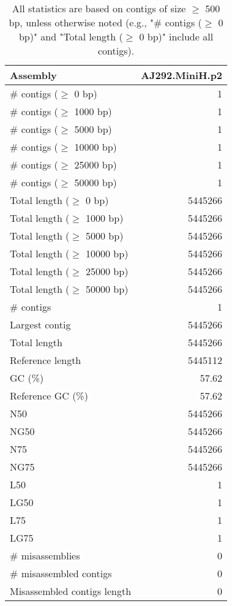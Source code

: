 \documentclass[12pt,a4paper]{article}
\begin{document}
\begin{table}[ht]
\begin{center}
\caption{All statistics are based on contigs of size $\geq$ 500 bp, unless otherwise noted (e.g., "\# contigs ($\geq$ 0 bp)" and "Total length ($\geq$ 0 bp)" include all contigs).}
\begin{tabular}{|l*{1}{|r}|}
\hline
Assembly & AJ292.MiniH.p2 \\ \hline
\# contigs ($\geq$ 0 bp) & 1 \\ \hline
\# contigs ($\geq$ 1000 bp) & 1 \\ \hline
\# contigs ($\geq$ 5000 bp) & 1 \\ \hline
\# contigs ($\geq$ 10000 bp) & 1 \\ \hline
\# contigs ($\geq$ 25000 bp) & 1 \\ \hline
\# contigs ($\geq$ 50000 bp) & 1 \\ \hline
Total length ($\geq$ 0 bp) & 5445266 \\ \hline
Total length ($\geq$ 1000 bp) & 5445266 \\ \hline
Total length ($\geq$ 5000 bp) & 5445266 \\ \hline
Total length ($\geq$ 10000 bp) & 5445266 \\ \hline
Total length ($\geq$ 25000 bp) & 5445266 \\ \hline
Total length ($\geq$ 50000 bp) & 5445266 \\ \hline
\# contigs & 1 \\ \hline
Largest contig & 5445266 \\ \hline
Total length & 5445266 \\ \hline
Reference length & 5445112 \\ \hline
GC (\%) & 57.62 \\ \hline
Reference GC (\%) & 57.62 \\ \hline
N50 & 5445266 \\ \hline
NG50 & 5445266 \\ \hline
N75 & 5445266 \\ \hline
NG75 & 5445266 \\ \hline
L50 & 1 \\ \hline
LG50 & 1 \\ \hline
L75 & 1 \\ \hline
LG75 & 1 \\ \hline
\# misassemblies & 0 \\ \hline
\# misassembled contigs & 0 \\ \hline
Misassembled contigs length & 0 \\ \hline

\end{tabular}
\end{center}
\end{table}
\end{document}
